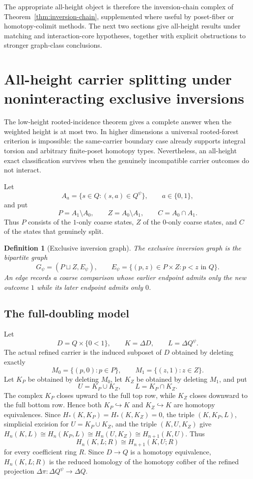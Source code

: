 \documentclass[11pt]{article}
\newtheorem{definition}[theorem]{Definition}
\begin{document}
The appropriate all-height object is therefore the inversion-chain complex of
Theorem~\ref{thm:inversion-chain}, supplemented where useful by poset-fiber or
homotopy-colimit methods.  The next two sections give all-height results under
matching and interaction-core hypotheses, together with explicit obstructions
to stronger graph-class conclusions.


\section{All-height carrier splitting under noninteracting exclusive inversions}
\label{sec:exclusive-matching}

The low-height rooted-incidence theorem gives a complete answer when the
weighted height is at most two.  In higher dimensions a universal rooted-forest
criterion is impossible: the same-carrier boundary case already supports
integral torsion and arbitrary finite-poset homotopy types.  Nevertheless, an
all-height exact classification survives when the genuinely incompatible
carrier outcomes do not interact.

Let
\[
A_a=\{s\in Q:(s,a)\in Q^\psi\},\qquad a\in\{0,1\},
\]
and put
\[
P=A_1\setminus A_0,\qquad Z=A_0\setminus A_1,\qquad
C=A_0\cap A_1.
\]
Thus $P$ consists of the $1$-only coarse states, $Z$ of the $0$-only coarse
states, and $C$ of the states that genuinely split.

\begin{definition}[Exclusive inversion graph]
\label{def:exclusive-inversion-graph}
The \emph{exclusive inversion graph} is the bipartite graph
\[
G_\psi=(P\sqcup Z,E_\psi),\qquad
E_\psi=\{(p,z)\in P\times Z:p<z\text{ in }Q\}.
\]
An edge records a coarse comparison whose earlier endpoint admits only the new
outcome $1$ while its later endpoint admits only $0$.
\end{definition}

\subsection{The full-doubling model}

Let
\[
D=Q\times\{0<1\},\qquad K=\Delta D,\qquad L=\Delta Q^\psi.
\]
The actual refined carrier is the induced subposet of $D$ obtained by deleting
exactly
\[
M_0=\{(p,0):p\in P\},\qquad
M_1=\{(z,1):z\in Z\}.
\]
Let $K_P$ be obtained by deleting $M_0$, let $K_Z$ be obtained by deleting
$M_1$, and put
\[
U=K_P\cup K_Z,\qquad L=K_P\cap K_Z.
\]
The complex $K_P$ closes upward to the full top row, while $K_Z$ closes
downward to the full bottom row.  Hence both $K_P\hookrightarrow K$ and
$K_Z\hookrightarrow K$ are homotopy equivalences.  Since $H_*(K,K_P)=H_*(K,K_Z)=0$, the triple $(K,K_P,L)$,
simplicial excision for $U=K_P\cup K_Z$, and the triple $(K,U,K_Z)$ give
$H_n(K,L)\cong H_n(K_P,L)\cong H_n(U,K_Z)\cong H_{n+1}(K,U)$.
Thus
\begin{equation}
H_n(K,L;R)\cong H_{n+1}(K,U;R)
\label{eq:two-colour-shift}
\end{equation}
for every coefficient ring $R$.  Since $D\to Q$ is a homotopy equivalence,
$H_n(K,L;R)$ is the reduced homology of the homotopy cofiber of the refined
projection $\Delta\pi:\Delta Q^\psi\to\Delta Q$.
\end{document}
